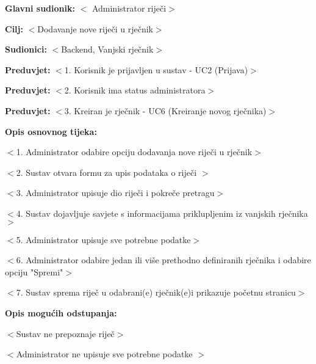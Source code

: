 						\noindent {}
					\begin{packed_item}
						
						\item \textbf{Glavni sudionik: }$<$ Administrator riječi$>$
						\item  \textbf{Cilj:} $<$Dodavanje nove riječi u rječnik$>$
						\item  \textbf{Sudionici:} $<$Backend, Vanjski rječnik$>$
						\item  \textbf{Preduvjet:} $<$1. Korisnik je prijavljen u sustav - UC2 (Prijava)$>$
						\item  \textbf{Preduvjet:} $<$2. Korisnik ima status administratora$>$
						\item  \textbf{Preduvjet:} $<$3. Kreiran je rječnik - UC6 (Kreiranje novog rječnika)$>$
						\item  \textbf{Opis osnovnog tijeka:}
						
						\item[] \begin{packed_enum}
							
							\item $<$1. Administrator odabire opciju dodavanja nove riječi u rječnik$>$
							\item $<$2. Sustav otvara formu za upis podataka o riječi $>$
							\item $<$3. Administrator upisuje dio riječi i pokreče pretragu$>$
							\item $<$4. Sustav dojavljuje savjete s informacijama priklupljenim iz vanjskih rječnika$>$
							\item $<$5. Administrator upisuje sve potrebne podatke$>$
							\item $<$6. Administrator odabire jedan ili više prethodno definiranih rječnika i odabire opciju "Spremi"$>$
							\item $<$7. Sustav sprema riječ u odabrani(e) rječnik(e)i prikazuje početnu stranicu$>$
						\end{packed_enum}
						
						\item  \textbf{Opis mogućih odstupanja:}
						
						\item[] \begin{packed_item}
							
							\item[4.a] $<$Sustav ne prepoznaje riječ$>$
							\item[5.a] $<$Administrator ne upisuje sve potrebne podatke $>$
							\item[] \begin{packed_enum}
								

\end{packed_enum}
\end{packed_item}
\end{packed_item}
